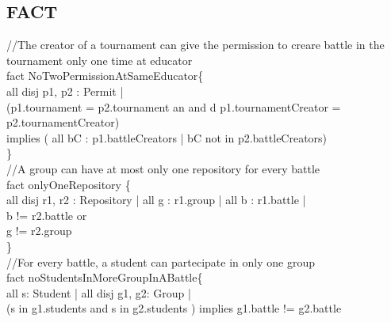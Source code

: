 \documentclass{article}
\begin{document}
{\subsection{FACT}
    \color{gray}
    //The creator of a tournament can give the permission to creare battle in the tournament only one time at educator\\
    \color{black}
    fact NoTwoPermissionAtSameEducator\{\\
        \-\hspace{1cm} \color{blue} all disj \color{black} p1, p2 : Permit | \\
        \-\hspace{1cm} (p1.tournament \color{blue} = \color{black} p2.tournament an\color{blue} and \color{black}d p1.tournamentCreator \color{blue} = \color{black} p2.tournamentCreator) \\
        \-\hspace{1cm} implies (\color{blue} all \color{black} bC : p1.battleCreators | bC \color{blue} not in \color{black} p2.battleCreators)\\
    \}
    \\
    \color{gray}
    //A group can have at most only one repository for every battle\\
    \color{blue} fact \color{black} onlyOneRepository \{\\
	    \-\hspace{1cm} \color{blue} all disj \color{black} r1, r2 : Repository | \color{blue} all \color{black} g : r1.group | \color{blue} all \color{black} b : r1.battle | \\
        \-\hspace{1cm}b \color{blue} != \color{black} r2.battle or \\
        \-\hspace{1cm}g \color{blue} != \color{black} r2.group \\
    \}
    \\
    \color{gray}
    //For every battle, a student can partecipate in only one group\\
    \color{black}
    \color{blue} fact \color{black} noStudentsInMoreGroupInABattle\{\\
	    \-\hspace{1cm} \color{blue} all \color{black} s: Student | \color{blue} all disj \color{black} g1, g2: Group | \\
        \-\hspace{1cm}(s \color{blue} in \color{black} g1.students \color{blue} and \color{black} s \color{blue} in \color{black} g2.students ) \color{blue} implies \color{black} g1.battle != g2.battle \\
}
\end{document}
